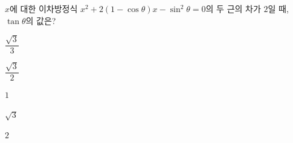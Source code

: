 $x$에 대한 이차방정식 $x^2+2(1-\cos\theta)x-\sin^2\theta=0$의 두 근의 차가 $2$일 때, $\tan\theta$의 값은? 
\begin{choices32}{\rule[-3ex]{0pt}{8ex}$\dfrac{\sqrt{3}}{3}$}{\rule[-3ex]{0pt}{8ex}$\dfrac{\sqrt{3}}{2}$}{\rule[-3ex]{0pt}{8ex}$1$}{\rule[-3ex]{0pt}{8ex}$\sqrt{3}$}{\rule[-3ex]{0pt}{8ex}$2$}\end{choices32}

